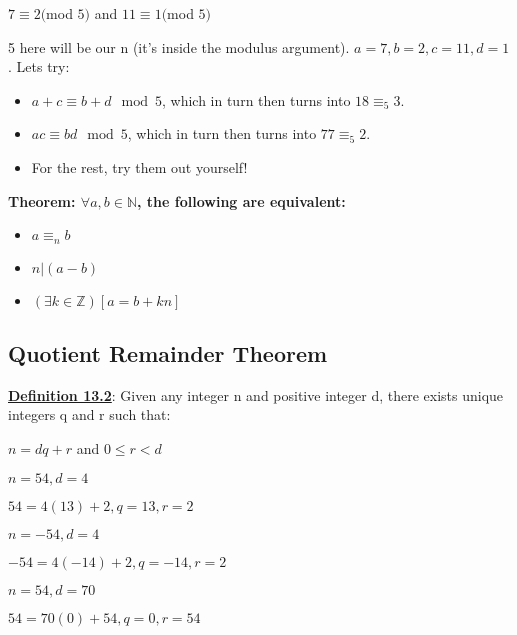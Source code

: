 \begin{example}
    $7 \equiv 2 ($mod $5)$ and $11 \equiv 1 ($mod $5)$
\end{example}

5 here will be our n (it's inside the modulus argument). $a=7, b=2, c=11, d=1$. Lets try:
\begin{itemize}
    \item $a+c \equiv b+d \mod 5$, which in turn then turns into $18 \equiv_5 3$.
    \item $ac \equiv bd \mod 5$, which in turn then turns into $77 \equiv_5 2 $.
    \item For the rest, try them out yourself!
\end{itemize}

\begin{example}
    \textbf{Theorem: $\forall a,b \in \mathbb{N}$, the following are equivalent:}
    \begin{itemize}
        \item $a \equiv_n b$
        \item $n|(a-b)$
        \item $(\exists k \in \mathbb{Z})[a=b+kn]$
    \end{itemize}
\end{example}

\subsection{Quotient Remainder Theorem}
\textbf{\underline{Definition 13.2}}: Given any integer n and positive integer d, there exists unique integers q and r such that:

\begin{center}
    $n = dq + r $ and $0 \leq r < d$
\end{center}

\begin{example}
    $n = 54, d = 4$
\end{example}

$54=4(13)+2, q =13, r=2$

\begin{example}
    $n = -54, d = 4$
\end{example}

$-54=4(-14)+2, q=-14, r=2$

\begin{example}
    $n = 54, d = 70$
\end{example}

$54=70(0)+54, q=0, r=54$

